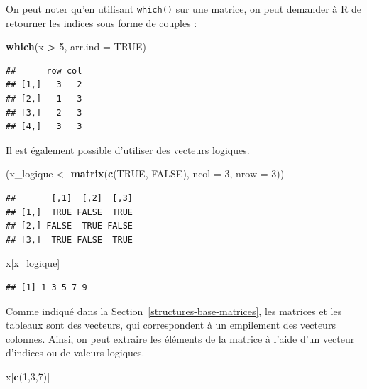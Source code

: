 \documentclass[
  11pt,
]{book}
\newenvironment{Shaded}{\begin{snugshade}}{\end{snugshade}}
\newcommand{\DataTypeTok}[1]{\textcolor[rgb]{0.13,0.29,0.53}{#1}}
\newcommand{\DecValTok}[1]{\textcolor[rgb]{0.00,0.00,0.81}{#1}}
\newcommand{\KeywordTok}[1]{\textcolor[rgb]{0.13,0.29,0.53}{\textbf{#1}}}
\newcommand{\NormalTok}[1]{#1}
\newcommand{\OperatorTok}[1]{\textcolor[rgb]{0.81,0.36,0.00}{\textbf{#1}}}
\newcommand{\OtherTok}[1]{\textcolor[rgb]{0.56,0.35,0.01}{#1}}
\newcommand{\StringTok}[1]{\textcolor[rgb]{0.31,0.60,0.02}{#1}}
\numberwithin{equation}{section}
\numberwithin{countremarque}{section}
\begin{document}
On peut noter qu'en utilisant \texttt{which()} sur une matrice, on peut demander à R de retourner les indices sous forme de couples :

\begin{Shaded}
\begin{Highlighting}[]
\KeywordTok{which}\NormalTok{(x }\OperatorTok{\textgreater{}}\StringTok{ }\DecValTok{5}\NormalTok{, }\DataTypeTok{arr.ind =} \OtherTok{TRUE}\NormalTok{)}
\end{Highlighting}
\end{Shaded}

\begin{lstlisting}
##      row col
## [1,]   3   2
## [2,]   1   3
## [3,]   2   3
## [4,]   3   3
\end{lstlisting}

Il est également possible d'utiliser des vecteurs logiques.

\begin{Shaded}
\begin{Highlighting}[]
\NormalTok{(x\_logique \textless{}{-}}\StringTok{ }\KeywordTok{matrix}\NormalTok{(}\KeywordTok{c}\NormalTok{(}\OtherTok{TRUE}\NormalTok{, }\OtherTok{FALSE}\NormalTok{), }\DataTypeTok{ncol =} \DecValTok{3}\NormalTok{, }\DataTypeTok{nrow =} \DecValTok{3}\NormalTok{))}
\end{Highlighting}
\end{Shaded}

\begin{lstlisting}
##       [,1]  [,2]  [,3]
## [1,]  TRUE FALSE  TRUE
## [2,] FALSE  TRUE FALSE
## [3,]  TRUE FALSE  TRUE
\end{lstlisting}

\begin{Shaded}
\begin{Highlighting}[]
\NormalTok{x[x\_logique]}
\end{Highlighting}
\end{Shaded}

\begin{lstlisting}
## [1] 1 3 5 7 9
\end{lstlisting}

Comme indiqué dans la Section~\ref{structures-base-matrices}, les matrices et les tableaux sont des vecteurs, qui correspondent à un empilement des vecteurs colonnes. Ainsi, on peut extraire les éléments de la matrice à l'aide d'un vecteur d'indices ou de valeurs logiques.

\begin{Shaded}
\begin{Highlighting}[]
\NormalTok{x[}\KeywordTok{c}\NormalTok{(}\DecValTok{1}\NormalTok{,}\DecValTok{3}\NormalTok{,}\DecValTok{7}\NormalTok{)]}
\end{Highlighting}
\end{Shaded}
\end{document}
